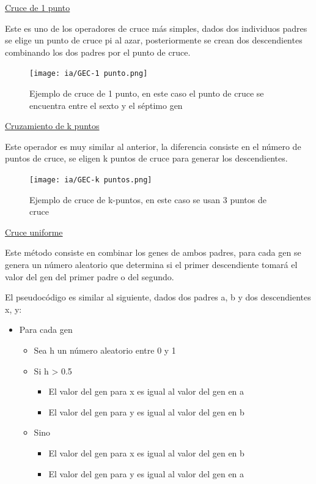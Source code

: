 \documentclass[11pt,fleqn]{book} %
\begin{document}
\underline{Cruce de 1 punto}

Este es uno de los operadores de cruce más simples, dados dos individuos padres se elige un punto de cruce pi al azar, posteriormente se crean dos descendientes combinando los dos padres por el punto de cruce.

\begin{figure}[ht]
\centering\texttt{[image: ia/GEC-1 punto.png]}
\caption{Ejemplo de cruce de 1 punto, en este caso el punto de cruce se encuentra entre el sexto y el séptimo gen}
\label{fig:gec-1-punto} 
\end{figure}

\underline{Cruzamiento de k puntos}

Este operador es muy similar al anterior, la diferencia consiste en el número de puntos de cruce, se eligen k puntos de cruce para generar los descendientes.

\begin{figure}[ht]
\centering\texttt{[image: ia/GEC-k puntos.png]}
\caption{Ejemplo de cruce de k-puntos, en este caso se usan 3 puntos de cruce}
\label{fig:gec-k-punto} 
\end{figure}

\underline{Cruce uniforme}

Este método consiste en combinar los genes de ambos padres, para cada gen se genera un número aleatorio que determina si el primer descendiente tomará el valor del gen del primer padre o del segundo. 

El pseudocódigo es similar al siguiente, dados dos padres a, b y dos descendientes x, y:

\begin{itemize}
\item Para cada gen
\begin{itemize}
\item Sea h un número aleatorio entre 0 y 1
\item Si h > 0.5
\begin{itemize}
\item El valor del gen para x es igual al valor del gen en a
\item El valor del gen para y es igual al valor del gen en b
\end{itemize}

\item Sino
\begin{itemize}
\item El valor del gen para x es igual al valor del gen en b
\item El valor del gen para y es igual al valor del gen en a
\end{itemize}
\end{itemize}
\end{itemize}
\end{document}
